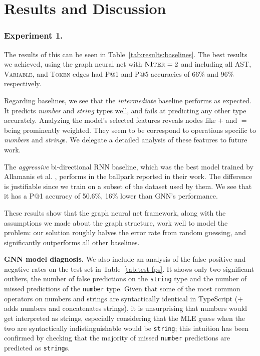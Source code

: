 \section{Results and Discussion}
\label{sec:results}
\subsubsection{Experiment 1.}
The results of this can be seen in Table~\ref{tab:results:baselines}.
The best results we achieved, using the graph neural net with $\textsc{NIter}=2$ and including all AST, \textsc{Variable}, and \textsc{Token} edges had P@1 and P@5 accuracies of 66\% and 96\% respectively.

Regarding baselines, we see that the \textit{intermediate} baseline performs as expected. It predicts \textit{number} and \textit{string} types well, and fails at predicting any other type accurately. Analyzing the model's selected features reveals nodes like $+$ and $=$ being prominently weighted. They seem to be correspond to operations specific to \textit{number}s and \textit{string}s. We delegate a detailed analysis of these features to future work. 

The \textit{aggressive} bi-directional RNN baseline, which was the best model trained by Allamanis et al. \cite{hellendoorn2018deep}, performs in the ballpark reported in their work. The difference is justifiable since we train on a subset of the dataset used by them. We see that it has a P@1 accuracy of 50.6\%, 16\% lower than GNN's performance.

These results show that the graph neural net framework, along with the assumptions we made about the graph structure, work well to model the problem: our solution roughly halves the error rate from random guessing, and significantly outperforms all other baselines.

\textbf{GNN model diagnosis.} We also include an analysis of the false positive and negative rates on the test set in Table~\ref{tab:test-fps}. It shows only two significant outliers, the number of false predictions on the \texttt{string} type and the number of missed predictions of the \texttt{number} type. 
Given that some of the most common operators on numbers and strings are syntactically identical in TypeScript ($+$ adds numbers and concatenates strings), it is unsurprising that numbers would get interpreted as strings, especially considering that the MLE guess when the two are syntactically indistinguishable would be \texttt{string}; this intuition has been confirmed by checking that the majority of missed \texttt{number} predictions are predicted as \texttt{string}s.

